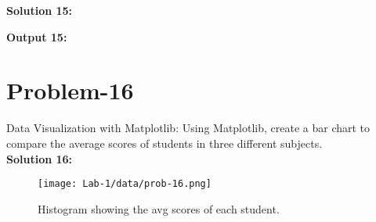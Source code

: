 \textbf{Solution 15: }


\textbf{Output 15:}
\\

\section{Problem-16}
Data Visualization with Matplotlib: Using Matplotlib, create a bar chart to compare the average scores of students in three different subjects.\\

\textbf{Solution 16:}


\begin{figure}[ht]
\centering
\texttt{[image: Lab-1/data/prob-16.png]}
\caption{Histogram showing the avg scores of each student.}
\label{fig:sample}
\end{figure}